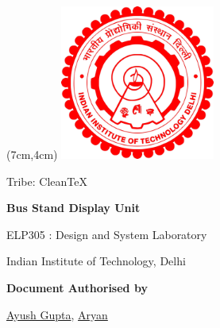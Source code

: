 \renewcommand{\thefootnote}{\alph{footnote}}
\begin{titlepage}

       \begin{textblock*}{6cm}(7cm,4cm)
       \includegraphics[width=2in]{Files/Images/iitdlogo.png}
       \end{textblock*}
            \vskip1in
	        \raggedright
            \vskip3in
              {%
				\fontsize{20}{28}
				\boldmath
				\sffamily
				 Tribe: CleanTeX
				\par
            }
             \vskip0.25in
           
             {
				\Large
				\fontsize{28}{32}
				\bfseries
				\boldmath
				\sffamily
                Bus Stand Display Unit
				\par
            }
            \vskip0.15in
             {
				\fontsize{18}{18}
				\sffamily
                
				\par
            }
            \vskip0.15in
             {
				\fontsize{16}{16}
				\sffamily
                ELP305 : Design and System Laboratory
				\par
            }
            \vskip0.15in
             {
				\fontsize{16}{14}
				\sffamily
                Indian Institute of Technology, Delhi	
                \par
            }
    \vspace{0.5in}
    {
        \normalsize
        \sffamily
        \textbf{\textcolor{tuberlindarkgray}{Document Authorised by}}\par \vspace{0.125cm}
        {\href{https://www.linkedin.com/in/ayush-gupta-undergraduate/}{Ayush Gupta}, \href{www.linkedin.com}{Aryan}}

}
\end{titlepage}
